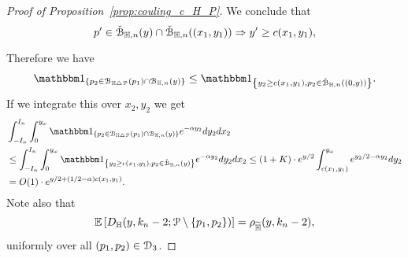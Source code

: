 \begin{proof}[Proof of Proposition~\ref{prop:couling_c_H_P}]
We conclude that 
\begin{equation*}\label{eq:intersex_approx}
	p^\prime \in \check{{\mathcal B}}_{\mathbb{H},n}(y)\cap \check{{\mathcal B}}_{\mathbb{H},n}((x_1,y_1)) \Rightarrow y^\prime \ge c(x_1,y_1),
\end{equation*}

Therefore we have 
\begin{equation} \label{eq:symdiff_loc}
\begin{split} 
 \ind{p_2 \in \BallSym{p_1}\cap \BallHyp{y}} \leq \ind{y_2 \geq c(x_1,y_1), p_2 \in \FatBallHyp{(0,y)}}.
\end{split}
\end{equation}
If we integrate this over $x_2, y_2$ we get 
\begin{equation*}
\begin{split}
&\int_{-I_n}^{I_n} \int_{0}^{y_\omega}  \ind{p_2 \in \BallSym{p_1}\cap \BallHyp{y}}  
e^{-\alpha y_2} dy_2 dx_2\\
&  \leq 
\int_{-I_n}^{I_n} \int_{0}^{y_\omega}  \ind{y_2 \geq c(x_1,y_1), p_2 \in \FatBallHyp{y}}  
e^{-\alpha y_2} dy_2 dx_2 
\leq 
(1+K) \cdot e^{y/2} \int_{c(x_1,y_1)}^{y_\omega} e^{y_2/2 - \alpha y_2} dy_2 \\
&=O(1) \cdot e^{y/2 + (1/2 -\alpha) c(x_1,y_1)}.
\end{split}
\end{equation*}
Note also that 
\[
	\mathbb{E}\left[D_{\mathbb{H}} (y,k_n-2;{\mathcal P} \setminus \{p_1, p_2\})\right] = \rho_{\widetilde{\mathbb{H}}}(y,k_n-2),
\]
uniformly over all $(p_1, p_2) \in \mathcal{D}_{3}$. 


\end{proof}
